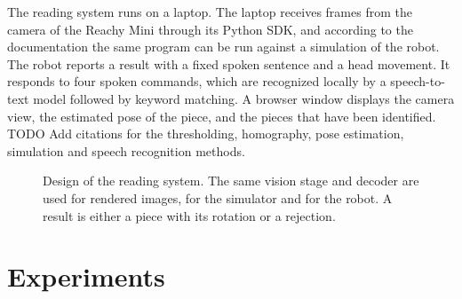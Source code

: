 \documentclass{lipics-v2021}
\newcommand{\todo}[1]{{\color{blue}TODO #1}}
\begin{document}
The reading system runs on a laptop.
The laptop receives frames from the camera of the Reachy Mini through its Python SDK, and according to the documentation the same program can be run against a simulation of the robot.
The robot reports a result with a fixed spoken sentence and a head movement.
It responds to four spoken commands, which are recognized locally by a speech-to-text model followed by keyword matching.
A browser window displays the camera view, the estimated pose of the piece, and the pieces that have been identified.
\todo{Add  citations for the thresholding, homography, pose estimation, simulation and speech recognition methods.}

\begin{figure}[htbp]
\centering
{}
\caption{Design of the reading system.
The same vision stage and decoder are used for rendered images, for the simulator and for the robot.
A result is either a piece with its rotation or a rejection.}
\label{fig:pipeline}
\end{figure}


\section{Experiments}
\label{sec:experiments}
\end{document}
